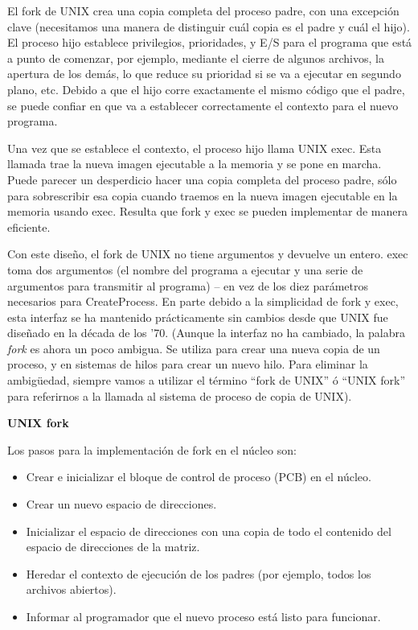 \documentclass[10pt]{book}
\begin{document}
El {\mf fork} de UNIX crea una copia completa del proceso padre, con una excepción clave (necesitamos una manera de distinguir cuál copia es el padre y cuál el hijo). El proceso hijo establece privilegios, prioridades, y E/S para el programa que está a punto de comenzar, por ejemplo, mediante el cierre de algunos archivos, la apertura de los demás, lo que reduce su prioridad si se va a ejecutar en segundo plano, etc. Debido a que el hijo corre exactamente el mismo código que el padre, se puede confiar en que va a establecer correctamente el contexto para el nuevo programa.

Una vez que se establece el contexto, el proceso hijo llama UNIX {\mf exec}. Esta llamada trae la nueva imagen ejecutable a la memoria y se pone en marcha. Puede parecer un desperdicio hacer una copia completa del proceso padre, sólo para sobrescribir esa copia cuando traemos en la nueva imagen ejecutable en la memoria usando {\mf exec}. Resulta que {\mf fork} y {\mf exec} se pueden implementar de manera eficiente.

Con este diseño, el {\mf fork} de UNIX no tiene argumentos y devuelve un entero. {\mf exec} toma dos argumentos (el nombre del programa a ejecutar y una serie de argumentos para transmitir al programa) -- en vez de los diez parámetros necesarios para {\mf CreateProcess}. En parte debido a la simplicidad de {\mf fork} y {\mf exec}, esta interfaz se ha mantenido prácticamente sin cambios desde que UNIX fue diseñado en la década de los '70. (Aunque la interfaz no ha cambiado, la palabra \textit{fork} es ahora un poco ambigua. Se utiliza para crear una nueva copia de un proceso, y en sistemas de hilos para crear un nuevo hilo. Para eliminar la ambigüedad, siempre vamos a utilizar el término ``{\mf fork} de UNIX'' ó ``UNIX {\mf fork}'' para referirnos a la llamada al sistema de proceso de copia de UNIX).

\textbf{UNIX {\mf fork}}

Los pasos para la implementación de {\mf fork} en el núcleo son:
\begin{itemize}
\item Crear e inicializar el bloque de control de proceso (PCB) en el núcleo.
\item Crear un nuevo espacio de direcciones.
\item Inicializar el espacio de direcciones con una copia de todo el contenido del espacio de direcciones de la matriz.
\item Heredar el contexto de ejecución de los padres (por ejemplo, todos los archivos abiertos).
\item Informar al programador que el nuevo proceso está listo para funcionar.
\end{itemize}
\end{document}
